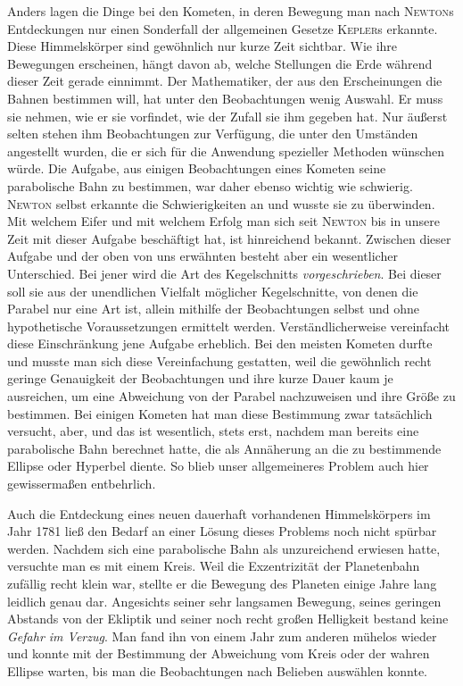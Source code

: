 Anders lagen die Dinge bei den Kometen, in deren Bewegung man nach \textsc{Newton}s Entdeckungen nur einen Sonderfall der allgemeinen Gesetze \textsc{Kepler}s erkannte. Diese Himmelskörper sind gewöhnlich nur kurze Zeit sichtbar. Wie ihre Bewegungen erscheinen, hängt davon ab, welche Stellungen die Erde während dieser Zeit gerade einnimmt. Der Mathematiker, der aus den Erscheinungen die Bahnen bestimmen will,
hat unter den Beobachtungen wenig Auswahl. Er muss sie nehmen, wie er sie vorfindet, wie der Zufall sie ihm gegeben hat. Nur äußerst selten stehen ihm Beobachtungen zur Verfügung, die unter den Umständen angestellt wurden, die er sich für die Anwendung spezieller Methoden wünschen würde. Die Aufgabe, aus einigen Beobachtungen eines Kometen seine parabolische Bahn zu bestimmen, war daher ebenso wichtig wie schwierig. \textsc{Newton} selbst erkannte die Schwierigkeiten an und wusste sie zu überwinden. Mit welchem Eifer und mit welchem Erfolg man sich seit \textsc{Newton} bis in unsere Zeit mit dieser Aufgabe beschäftigt hat, ist hinreichend bekannt. Zwischen dieser Aufgabe und der oben von uns erwähnten besteht aber ein wesentlicher Unterschied. Bei jener wird die Art des Kegelschnitts \textit{vorgeschrieben}. Bei dieser soll sie aus der unendlichen Vielfalt möglicher Kegelschnitte, von denen die Parabel nur eine Art ist, allein mithilfe der Beobachtungen selbst und ohne hypothetische Voraussetzungen ermittelt werden. Verständlicherweise vereinfacht diese Einschränkung jene Aufgabe erheblich. Bei den meisten Kometen durfte und musste man sich diese Vereinfachung gestatten, weil die gewöhnlich recht geringe Genauigkeit der Beobachtungen und ihre kurze Dauer kaum je ausreichen, um eine Abweichung von der Parabel nachzuweisen und ihre Größe zu bestimmen. Bei einigen Kometen hat man diese Bestimmung zwar tatsächlich versucht, aber, und das ist wesentlich, stets erst, nachdem man bereits eine parabolische Bahn berechnet hatte, die als Annäherung an die zu bestimmende Ellipse oder Hyperbel diente. So blieb unser allgemeineres Problem auch hier gewissermaßen entbehrlich.

Auch die Entdeckung eines neuen dauerhaft vorhandenen Himmelskörpers im Jahr 1781 ließ den Bedarf an einer Lösung dieses Problems noch nicht spürbar werden. Nachdem sich eine parabolische Bahn als unzureichend erwiesen hatte, versuchte man es mit einem Kreis. Weil die Exzentrizität der Planetenbahn zufällig recht klein war, stellte er die Bewegung des Planeten einige Jahre lang leidlich genau dar. Angesichts seiner sehr langsamen Bewegung, seines geringen Abstands von der Ekliptik und seiner noch recht großen Helligkeit bestand keine \textit{Gefahr im Verzug}. Man fand ihn von einem Jahr zum anderen mühelos wieder und konnte mit der Bestimmung der Abweichung vom Kreis oder der wahren Ellipse warten, bis man die Beobachtungen nach Belieben auswählen konnte.

